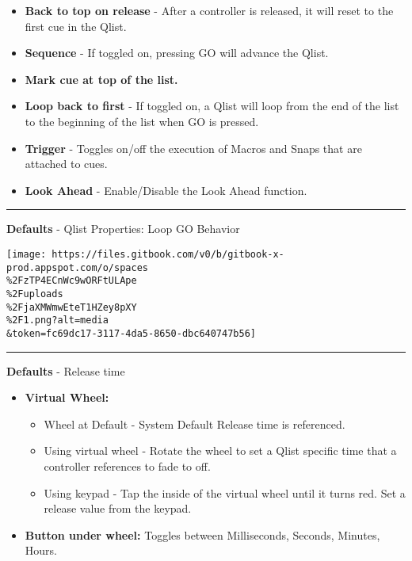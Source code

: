 \documentclass[
]{article}
\begin{document}
\begin{itemize}
\item
  \textbf{Back to top on release} - After a controller is released, it will reset to the first cue in the Qlist.
\item
  \textbf{Sequence} - If toggled on, pressing GO will advance the Qlist.
\item
  \textbf{Mark cue at top of the list.}
\item
  \textbf{Loop back to first} - If toggled on, a Qlist will loop from the end of the list to the beginning of the list when GO is pressed.
\item
  \textbf{Trigger} - Toggles on/off the execution of Macros and Snaps that are attached to cues.
\item
  \textbf{Look Ahead} - Enable/Disable the Look Ahead function.
\end{itemize}

\begin{center}\rule{0.5\linewidth}{0.5pt}\end{center}

\textbf{Defaults} - Qlist Properties: Loop GO Behavior

\texttt{[image: https://files.gitbook.com/v0/b/gitbook-x-prod.appspot.com/o/spaces\\\%2FzTP4ECnWc9wORFtULApe\\\%2Fuploads\\\%2FjaXMWmwEteT1HZey8pXY\\\%2F1.png?alt=media\\\&token=fc69dc17-3117-4da5-8650-dbc640747b56]}

\begin{center}\rule{0.5\linewidth}{0.5pt}\end{center}

\textbf{Defaults} - Release time

\begin{itemize}
\item
  \textbf{Virtual Wheel:}

  \begin{itemize}
  \item
    Wheel at Default - System Default Release time is referenced.
  \item
    Using virtual wheel - Rotate the wheel to set a Qlist specific time that a controller references to fade to off.
  \item
    Using keypad - Tap the inside of the virtual wheel until it turns red. Set a release value from the keypad.
  \end{itemize}
\item
  \textbf{Button under wheel:} Toggles between Milliseconds, Seconds, Minutes, Hours.
\end{itemize}
\end{document}
